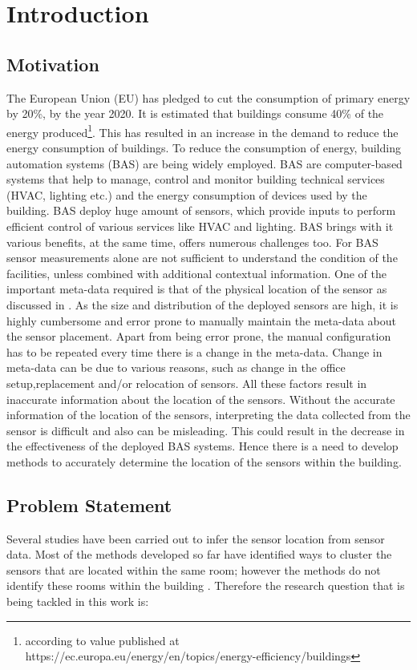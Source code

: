 \chapter{Introduction}
\label{chp:introduction}
\section{Motivation}
The European Union (EU) has pledged to cut the consumption of primary energy by 20\%, by the year 2020.  It is estimated that buildings consume 40\% of the energy produced\footnote{according to value published at https://ec.europa.eu/energy/en/topics/energy-efficiency/buildings }.  This has resulted in an increase in the demand to reduce the energy consumption of buildings. To reduce the consumption of energy, building automation systems (BAS) are being widely employed. BAS are computer-based systems that help to manage, control and monitor building technical services (HVAC, lighting etc.) and the energy consumption of devices used by the building.  BAS deploy huge amount of sensors, which provide inputs to perform efficient control of various services like HVAC and lighting. BAS brings with it various benefits, at the same time, offers numerous challenges too. For BAS sensor measurements alone are not sufficient to understand the condition of the facilities, unless combined with additional contextual information. One of the important meta-data required is that of the physical location of the sensor as discussed in  \cite{liu2009requirements}.
As the size and distribution of the deployed sensors are high, it is highly cumbersome and error prone to manually maintain the meta-data about the sensor placement. Apart from being error prone, the manual configuration has to be repeated every time there is a change in the meta-data. Change in meta-data can be due to various reasons, such as change in the office setup,replacement and/or relocation of sensors. All these factors result in inaccurate information about the location of the sensors. Without the accurate information of the location of the sensors, interpreting the data collected from the sensor is difficult and also can be misleading. This could result in the decrease in the effectiveness of the deployed BAS systems. Hence there is a need to develop methods to accurately determine the location of the sensors within the building.

\section{Problem Statement}
Several studies have been carried out to infer the sensor location from sensor data. Most of the methods developed so far have identified ways to cluster the sensors that are located within the same room; however the methods do not identify these rooms within the building \cite{doi:10.1061/9780784413616.226}.  Therefore the research question that is being tackled in this work is:

